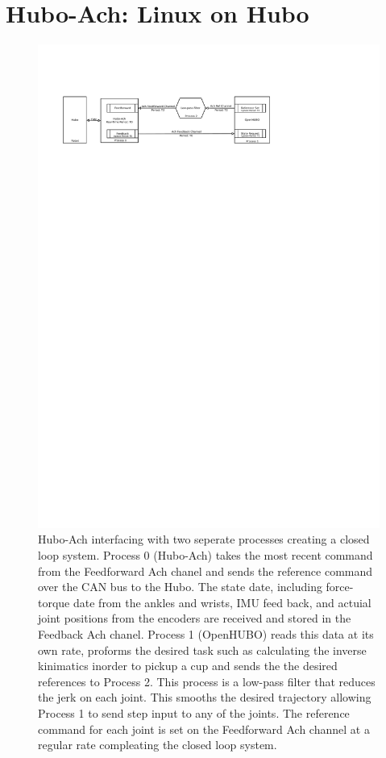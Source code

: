 \section{Hubo-Ach: Linux on Hubo}

\begin{figure}[thpb]
  \centering
\includegraphics[width=2.0\columnwidth]{./pix/hubo-ach-diagram-OpenHUBO.pdf}
  \caption{Hubo-Ach interfacing with two seperate processes creating a closed loop system.  Process 0 (Hubo-Ach) takes the most recent command from the Feedforward Ach chanel and sends the reference command over the CAN bus to the Hubo.  The state date, including force-torque date from the ankles and wrists, IMU feed back, and actuial joint positions from the encoders are received and stored in the Feedback Ach chanel.  Process 1 (OpenHUBO) reads this data at its own rate, proforms the desired task such as calculating the inverse kinimatics inorder to pickup a cup and sends the the desired references to Process 2.  This process is a low-pass filter that reduces the jerk on each joint.  This smooths the desired trajectory allowing Process 1 to send step input to any of the joints. The reference command for each joint is set on the Feedforward Ach channel at a regular rate compleating the closed loop system.}
  \label{fig:graph}
\end{figure}


